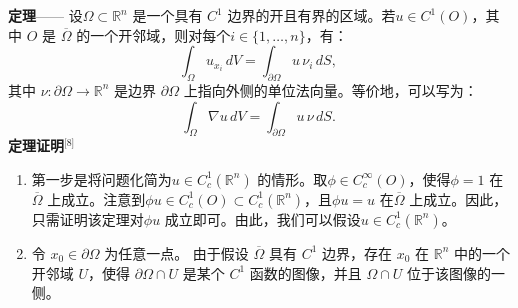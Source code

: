 \textbf{定理}—— 设$\displaystyle \Omega \subset \mathbb{R}^n$
是一个具有 $C^1$ 边界的开且有界的区域。若$\displaystyle u \in C^1(O)$，其中 $O$ 是 $\displaystyle \overline{\Omega}$ 的一个开邻域，则对每个$\displaystyle i \in \{1, \dots, n\}$，有：
$$
\int_{\Omega} u_{x_i} \, dV = \int_{\partial \Omega} u \, \nu_i \, dS ,~
$$
其中
$\displaystyle \nu : \partial \Omega \to \mathbb{R}^n$
是边界 $\partial \Omega$ 上指向外侧的单位法向量。等价地，可以写为：
$$
\int_{\Omega} \nabla u \, dV = \int_{\partial \Omega} u \, \nu \, dS .~
$$
\textbf{定理证明}\(^\text{[8]}\)
\begin{enumerate}
\item 第一步是将问题化简为$\displaystyle u \in C_c^1(\mathbb{R}^n)$ 的情形。取$\displaystyle \phi \in C_c^\infty(O)$，使得$\displaystyle \phi = 1$ 在$\displaystyle \overline{\Omega}$ 上成立。注意到$\displaystyle \phi u \in C_c^1(O) \subset C_c^1(\mathbb{R}^n)$，且$\displaystyle \phi u = u$ 在$\displaystyle \overline{\Omega}$ 上成立。因此，只需证明该定理对$\displaystyle \phi u$ 成立即可。由此，我们可以假设$\displaystyle u \in C_c^1(\mathbb{R}^n)$。
\item 令 $\displaystyle x_{0} \in \partial \Omega$ 为任意一点。
由于假设 $\displaystyle \overline{\Omega}$ 具有 $\displaystyle C^{1}$ 边界，存在 $\displaystyle x_{0}$ 在 $\displaystyle \mathbb{R}^{n}$ 中的一个开邻域 $\displaystyle U$，使得 $\displaystyle \partial\Omega \cap U$ 是某个 $\displaystyle C^{1}$ 函数的图像，并且 $\displaystyle \Omega \cap U$ 位于该图像的一侧。


\end{enumerate}
